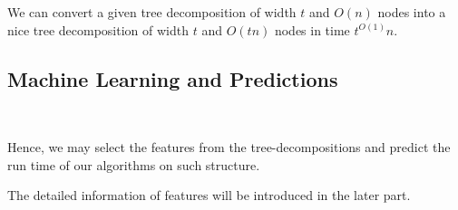 We can convert a given tree decomposition of width $t$ and $O(n)$ nodes into a nice
tree decomposition of width $t$ and $O(tn)$ nodes in time $t^{O(1)}n$\cite{FasterTD2019}.



\subsection{Machine Learning and Predictions}~\label{sec.subbackground3}

Hence, we may select the features from the tree-decompositions and predict the run time of our algorithms on such structure.

The detailed information of features will be introduced in the later part.